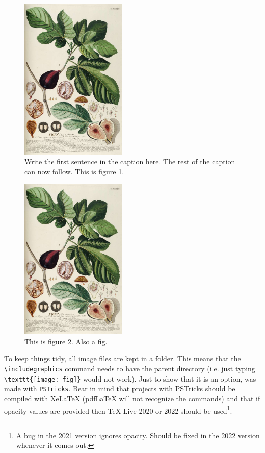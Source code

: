 \begin{figure}[h]
\begin{center}
\includegraphics[width=2in]{images/fig}
\end{center}
\caption[Write the first sentence in the caption here.]{Write the first sentence in the caption here. The rest of the caption can now follow. This is figure 1.}
\label{fig1}
\end{figure}

\begin{figure}[h]
\centering
\includegraphics[width=2in]{images/fig}
\caption[This is figure 2.]{This is figure 2. Also a fig.}
\label{fig2}
\end{figure}

To keep things tidy, all image files are kept in a folder. This means that the \verb|\includegraphics| command needs to have the parent directory (i.e. just typing \verb|\texttt{[image: fig]}| would not work). Just to show that it is an option,  was made with \texttt{PSTricks}. Bear in mind that projects with PSTricks should be compiled with XeLaTeX (pdfLaTeX will not recognize the commands) and that if opacity values are provided then TeX Live 2020 or 2022 should be used\footnote{A bug in the 2021 version ignores opacity. Should be fixed in the 2022 version whenever it comes out.}.

